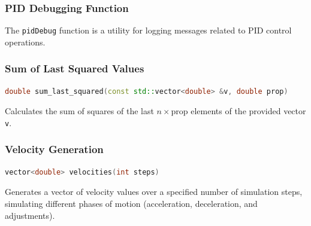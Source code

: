 \documentclass[a4paper,12pt]{article}
\begin{document}
\subsubsection{PID Debugging Function}
The \texttt{pidDebug} function is a utility for logging messages related to PID control operations.
\subsubsection{Sum of Last Squared Values}
\begin{lstlisting}[language=C++]
double sum_last_squared(const std::vector<double> &v, double prop)
\end{lstlisting}
Calculates the sum of squares of the last $n \times \text{prop}$ elements of the provided vector \texttt{v}.
\subsubsection{Velocity Generation}
\begin{lstlisting}[language=C++]
vector<double> velocities(int steps)
\end{lstlisting}
Generates a vector of velocity values over a specified number of simulation steps, simulating different phases of motion (acceleration, deceleration, and adjustments).
\end{document}
